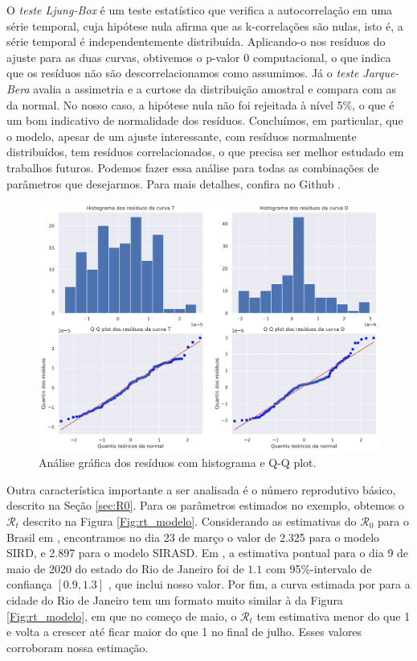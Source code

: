 O {\em teste Ljung-Box} \cite{ljung1978} é um teste estatístico que verifica a autocorrelação em uma série temporal, cuja hipótese nula afirma que as k-correlações são nulas, isto é, a série temporal é independentemente distribuída. 
Aplicando-o nos resíduos do ajuste para as duas curvas, obtivemos o p-valor 0 computacional, o que indica que os resíduos não são descorrelacionamos como assumimos. 
Já o {\em teste Jarque-Bera} \cite{jarque1980} avalia a assimetria e a curtose da distribuição amostral e compara com as da normal.
No nosso caso, a hipótese nula não foi rejeitada à nível 5\%, o que é um bom indicativo de normalidade dos resíduos. 
Concluímos, em particular, que o modelo, apesar de um ajuste interessante, com resíduos normalmente distribuídos, tem resíduos correlacionados, o que precisa ser melhor estudado em trabalhos futuros. 
Podemos fazer essa análise para todas as combinações de parâmetros que desejarmos. 
Para mais detalhes, confira no Github \cite{github}.

\begin{figure}
    \centering
    \includegraphics[width=.8\textwidth]{../images/check_residuals.png}
    \caption{Análise gráfica dos resíduos com histograma e Q-Q plot.}
    \label{Fig:check_residuals}
\end{figure}

Outra característica importante a ser analisada é o número reprodutivo básico,
descrito na Seção \ref{sec:R0}. Para os parâmetros estimados no exemplo,
obtemos o $\mathcal{R}_t$ descrito na Figura \ref{Fig:rt_modelo}. 
Considerando as estimativas do $\mathcal{R}_0$ para o Brasil em
\cite{rtBrasil2020}, encontramos no dia 23 de março o valor de 2.325
para o modelo SIRD, e 2.897 para o modelo SIRASD. Em
\cite{rt-imperial-college}, a estimativa pontual para o dia 9 de maio de 2020
do estado do Rio de Janeiro foi de $1.1$ com 95\%-intervalo de confiança
$[0.9, 1.3]$ , que inclui nosso valor. Por fim, a curva estimada por
\cite{observatorio} para a cidade do Rio de Janeiro tem um formato muito
similar à da Figura \ref{Fig:rt_modelo}, em que no começo de maio, o $\mathcal{R}_t$ tem estimativa menor do que 1 e
volta a crescer até ficar maior do que 1 no final de julho. Esses valores corroboram nossa estimação. 

